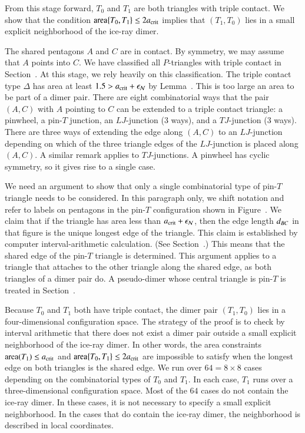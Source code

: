 From this stage forward, $T_0$ and $T_1$ are both triangles with
triple contact.  We show that the condition ${\operatorname{area}}\{T_0,T_1\}\le
2a_\text{crit}$ implies that $(T_1,T_0)$ lies in a small explicit
neighborhood of the ice-ray dimer.

The shared pentagons $A$ and $C$ are in contact.  By symmetry, we may
assume that $A$ points into $C$.  We have classified all $P$-triangles
with triple contact in Section~.  At this stage, we
rely heavily on this classification.  The triple contact type $\Delta$
has area at least $1.5 > a_\text{crit}+\epsilon_{\mathcal N}$ by Lemma~.
This is too large an area to be part of a dimer pair.  There are eight
combinatorial ways that the pair $(A,C)$ with $A$ pointing to $C$ can
be extended to a triple contact triangle: a pinwheel, a pin-$T$
junction, an $LJ$-junction (3 ways), and a $TJ$-junction (3 ways).
There are three ways of extending the edge along $(A,C)$ to an
$LJ$-junction depending on which of the three triangle edges of the
$LJ$-junction is placed along $(A,C)$.  A similar remark applies to
$TJ$-junctions.  A pinwheel has cyclic symmetry, so it gives rise to a
single case.

We need an argument to show that only a single combinatorial type of
pin-$T$ triangle needs to be considered.  In this paragraph only, we
shift notation and refer to labels on pentagons in the pin-$T$
configuration shown in Figure~.  We claim that if
the triangle has area less than $a_\text{crit}+\epsilon_{\mathcal N}$, then the edge
length $d_{BC}$ in that figure is the unique longest edge of the
triangle.  This claim is established by computer interval-arithmetic calculation.  (See
Section~.)  This means that the shared edge of the
pin-$T$ triangle is determined.
This argument applies to a triangle that attaches to the other
triangle along the shared edge, as both triangles of a dimer pair do.
A pseudo-dimer whose central triangle is pin-$T$ is treated in
Section~.

Because $T_0$ and $T_1$ both have triple contact, the dimer pair
$(T_1,T_0)$ lies in a four-dimensional configuration space.  The
strategy of the proof is to check by interval arithmetic that there does not
exist a dimer pair outside a small explicit neighborhood of the
ice-ray dimer.  In other words, the area constraints ${\operatorname{area}}(T_1)\le
a_\text{crit}$ and ${\operatorname{area}}\{T_0,T_1\}\le2a_\text{crit}$ are impossible to satisfy
when the longest edge on both triangles is the shared edge.  We run
over $64 = 8\times 8$ cases depending on the combinatorial types of
$T_0$ and $T_1$.  In each case, $T_1$ runs over a three-dimensional
configuration space.  Most of the $64$ cases do not contain the
ice-ray dimer.  In these cases, it is not necessary to specify a small
explicit neighborhood.  In the cases that do contain the ice-ray
dimer, the neighborhood is described in local coordinates.

